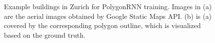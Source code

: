 \begin{figure}[!h]
{	}
    \caption[Example buildings in Zurich for PolygonRNN training]{Example buildings in Zurich for PolygonRNN training. Images in (a) are the aerial images obtained by Google Static Maps API. (b) is (a) covered by the corresponding polygon outline, which is visualized based on the ground truth.}
	\label{fig:egbui}
\end{figure}